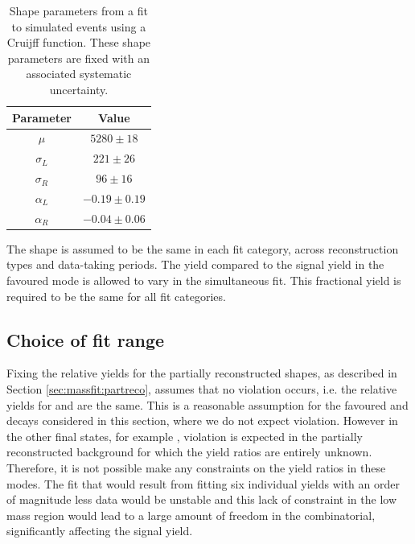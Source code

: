 \begin{table}[h]
\centering
\begin{tabular}{cc}
\hline
Parameter & Value \\
\hline
$\mu$ & $5280 \pm 18$ \\
$\sigma_L$ & $221 \pm 26$ \\
$\sigma_R$ & $96 \pm 16$ \\
$\alpha_L$ & $-0.19 \pm 0.19$ \\
$\alpha_R$ & $-0.04 \pm 0.06$ \\
\hline
\end{tabular}
\caption{Shape parameters from a fit to simulated \decay{\Lb}{\Lc\Km} events using a Cruijff function. These shape parameters are fixed with an associated systematic uncertainty.}
\label{fitresultsLb}
\end{table}

The shape is assumed to be the same in each \kk fit category, across \KS reconstruction types and data-taking periods. The  yield compared to the signal yield in the favoured \kpi mode is allowed to vary in the simultaneous fit. This fractional yield is required to be the same for all fit categories.

\subsection{Choice of fit range}
\label{sec:cpfit:range}	

Fixing the relative yields for the partially reconstructed shapes, as described in Section \ref{sec:massfit:partreco}, assumes that no \CP violation occurs, i.e. the relative yields for \Bm and \Bp are the same. This is a reasonable assumption for the favoured \kpi and \kpipipi decays considered in this section, where we do not expect \CP violation. However in the other \D final states, for example \pik, \CP violation is expected in the partially reconstructed background for which the yield ratios are entirely unknown. Therefore, it is not possible make any constraints on the yield ratios in these modes. The fit that would result from fitting six individual yields with an order of magnitude less data would be unstable and this lack of constraint in the low mass region would lead to a large amount of freedom in the combinatorial, significantly affecting the signal yield. 

